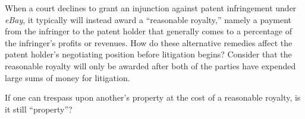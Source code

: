 \item When a court declines to grant an injunction against patent infringement
under \emph{eBay}, it typically will instead award a ``reasonable royalty,''
namely a payment from the infringer to the patent holder that generally comes to
a percentage of the infringer's profits or revenues. How do these alternative
remedies affect the patent holder's negotiating position before litigation
begins? Consider that the reasonable royalty will only be awarded after both of
the parties have expended large sums of money for litigation.

If one can trespass upon another's property at the cost of a reasonable royalty,
is it still ``property''?

